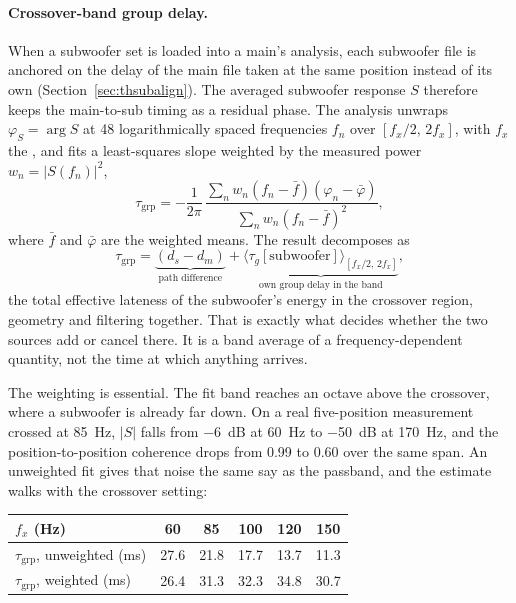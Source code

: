 \paragraph{Crossover-band group delay.} When a subwoofer set is loaded into a main's analysis, each subwoofer file is anchored on the delay of the main file taken at the same position instead of its own (Section~\ref{sec:thsubalign}). The averaged subwoofer response $S$ therefore keeps the main-to-sub timing as a residual phase. The analysis unwraps $\varphi_S = \arg S$ at 48 logarithmically spaced frequencies $f_n$ over $[f_x/2,\,2f_x]$, with $f_x$ the , and fits a least-squares slope weighted by the measured power $w_n = |S(f_n)|^2$,
\begin{equation}
  \tau_{\mathrm{grp}} = -\frac{1}{2\pi}\,
  \frac{\sum_n w_n (f_n-\bar f)(\varphi_n-\bar\varphi)}{\sum_n w_n (f_n-\bar f)^2},
  \label{eq:dlygrp}
\end{equation}
where $\bar f$ and $\bar\varphi$ are the weighted means. The result decomposes as
\begin{equation}
  \tau_{\mathrm{grp}} = \underbrace{(d_s - d_m)}_{\text{path difference}}
  + \underbrace{\bigl\langle \tau_g[\text{subwoofer}] \bigr\rangle_{[f_x/2,\,2f_x]}}_{\text{own group delay in the band}} ,
  \label{eq:dlydecomp}
\end{equation}
the total effective lateness of the subwoofer's energy in the crossover region, geometry and filtering together. That is exactly what decides whether the two sources add or cancel there. It is a band average of a frequency-dependent quantity, not the time at which anything arrives.

The weighting is essential. The fit band reaches an octave above the crossover, where a subwoofer is already far down. On a real five-position measurement crossed at \SI{85}{\hertz}, $|S|$ falls from \SI{-6}{\dB} at \SI{60}{\hertz} to \SI{-50}{\dB} at \SI{170}{\hertz}, and the position-to-position coherence drops from 0.99 to 0.60 over the same span. An unweighted fit gives that noise the same say as the passband, and the estimate walks with the crossover setting:

\begin{center}
\begin{tabular}{lccccc}
\toprule
$f_x$ (Hz) & 60 & 85 & 100 & 120 & 150\\
\midrule
$\tau_{\mathrm{grp}}$, unweighted (ms) & 27.6 & 21.8 & 17.7 & 13.7 & 11.3\\
$\tau_{\mathrm{grp}}$, weighted (ms)   & 26.4 & 31.3 & 32.3 & 34.8 & 30.7\\
\bottomrule
\end{tabular}
\end{center}

